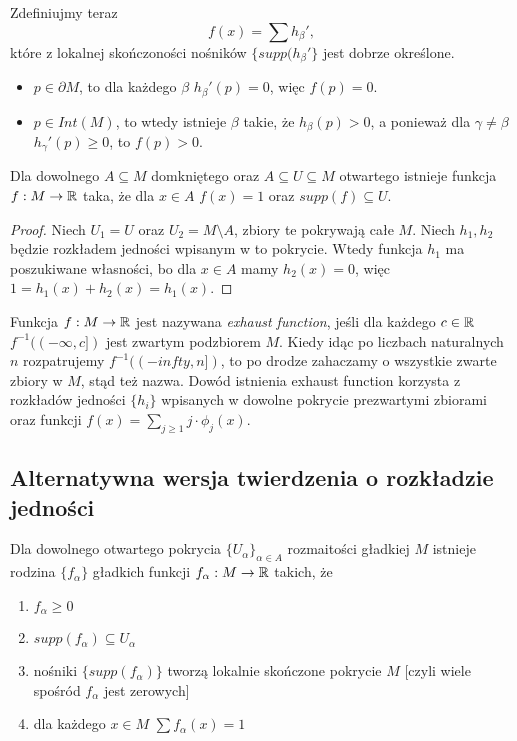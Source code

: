 \begin{example}
  Zdefiniujmy teraz
  $$f(x)=\sum h_\beta',$$
  które z lokalnej skończoności nośników $\{supp(h_\beta'\}$ jest dobrze określone.

  \begin{itemize}
    \item $p\in\partial M$, to dla każdego $\beta$ $h_\beta'(p)=0$, więc $f(p)=0$.
    \item $p\in Int(M)$, to wtedy istnieje $\beta$ takie, że $h_\beta(p)>0$, a ponieważ dla $\gamma\neq\beta$ $h_\gamma'(p)\geq0$, to $f(p)>0$.
  \end{itemize}
\item Dla dowolnego $A\subseteq M$ domkniętego oraz $A\subseteq U\subseteq M$ otwartego istnieje funkcja $f:M\to\mathbb{R}$ taka, że dla $x\in A$ $f(x)=1$ oraz $supp(f)\subseteq U$.
  
  \begin{proof}
    Niech $U_1=U$ oraz $U_2=M\setminus A$, zbiory te pokrywają całe $M$. Niech $h_1,h_2$ będzie rozkładem jedności wpisanym w to pokrycie. Wtedy funkcja $h_1$ ma poszukiwane własności, bo dla $x\in A$ mamy $h_2(x)=0$, więc $1=h_1(x)+h_2(x)=h_1(x)$.
  \end{proof}
\item Funkcja $f:M\to\mathbb{R}$ jest nazywana \emph{exhaust function}, jeśli dla każdego $c\in\mathbb{R}$ $f^{-1}((-\infty,c])$ jest zwartym podzbiorem $M$. Kiedy idąc po liczbach naturalnych $n$ rozpatrujemy $f^{-1}((-infty, n])$, to po drodze zahaczamy o wszystkie zwarte zbiory w $M$, stąd też nazwa. Dowód istnienia exhaust function korzysta z rozkładów jedności $\{h_i\}$ wpisanych w dowolne pokrycie prezwartymi zbiorami oraz funkcji $f(x)=\sum_{j\geq 1}j\cdot\phi_j(x)$.
\end{example}

\subsection{Alternatywna wersja twierdzenia o rozkładzie jedności}

\begin{theorem}
  Dla dowolnego otwartego pokrycia $\{U_\alpha\}_{\alpha\in A}$ rozmaitości gładkiej $M$ istnieje rodzina $\{f_\alpha\}$ gładkich funkcji $f_\alpha:M\to\mathbb{R}$ takich, że
  \begin{enumerate}
    \item $f_\alpha\geq0$
    \item $supp(f_\alpha)\subseteq U_\alpha$
    \item nośniki $\{supp(f_\alpha)\}$ tworzą lokalnie skończone pokrycie $M$ [czyli wiele spośród $f_\alpha$ jest zerowych]
    \item dla każdego $x\in M$ $\sum f_\alpha(x)=1$
  \end{enumerate}
\end{theorem}

